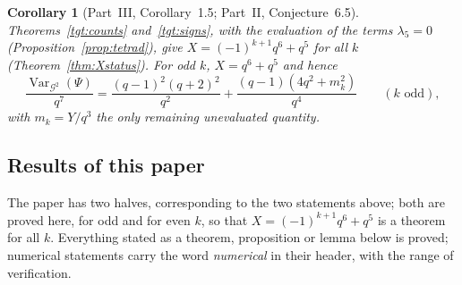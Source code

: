 \documentclass[12pt,a4paper]{amsart}
\newtheorem{corollary}[theorem]{Corollary}
\theoremstyle{definition}
\newcommand{\G}{\mathcal{G}}
\newcommand{\Var}{\operatorname{Var}}
\begin{document}
\begin{corollary}[Part~III, Corollary~1.5; Part~II, Conjecture~6.5]\label{cor:X}
Theorems~\ref{tgt:counts} and~\ref{tgt:signs}, with the evaluation of the terms $\lambda_5=0$ (Proposition~\ref{prop:tetrad}), give $X=(-1)^{k+1}q^6+q^5$ for all $k$ (Theorem~\ref{thm:Xstatus}). For odd $k$, $X=q^6+q^5$ and hence
\[
\frac{\Var_{\G^2}(\Psi)}{q^7}=\frac{(q-1)^2(q+2)^2}{q^2}+\frac{(q-1)(4q^2+m_k^2)}{q^4}\qquad(k\text{ odd}),
\]
with $m_k=Y/q^3$ the only remaining unevaluated quantity.
\end{corollary}

\subsection{Results of this paper}\label{subsec:results}
The paper has two halves, corresponding to the two statements above; both are proved here, for odd and for even $k$, so that $X=(-1)^{k+1}q^6+q^5$ is a theorem for all $k$. Everything stated as a theorem, proposition or lemma below is proved; numerical statements carry the word \emph{numerical} in their header, with the range of verification.
\end{document}
